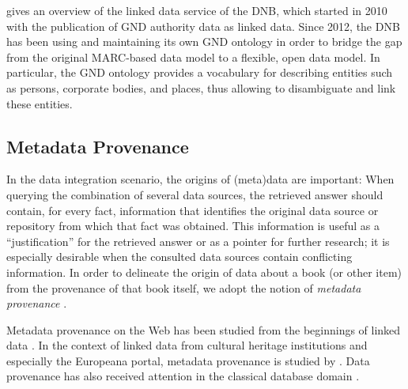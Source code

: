 \textcite{Hauser2014} gives an overview of the linked data service
of the \gls{DNB},
which started in 2010 with the publication of \gls{GND} authority data as linked data.
Since 2012, the \gls{DNB} has been using and maintaining its own \gls{GND} ontology \autocite{GNDOntology}
in order to bridge the gap from the original MARC-based data model to a flexible, open data model.
In particular, the \gls{GND} ontology provides a vocabulary for describing entities such as persons, corporate bodies, and places,
thus allowing to disambiguate and link these entities.

\subsection{Metadata Provenance}
\label{subsec:data_provenance}

In the data integration scenario, the origins of (meta)data are important:
When querying the combination of several data sources, the retrieved answer
should contain, for every fact, information that identifies the original data source or repository
from which that fact was obtained.
This information is useful as a \enquote{justification} for the retrieved answer
or as a pointer for further research;
it is especially desirable when the consulted data sources contain conflicting information.
In order to delineate the origin of data about a book (or other item)
from the provenance of that book itself,
we adopt the notion of \emph{metadata provenance} \autocite{Eckert2012}.

Metadata provenance on the Web
has been studied
from the beginnings of linked data
\autocite[see, e.g.][]{Hartig2009,Moreau2008,Moreau2008a}.
In the context of linked data from cultural heritage institutions
and especially the Europeana portal,
metadata provenance is studied by
\citeauthor{Eckert2013} \autocite*{Eckert2013,Eckert2013a,Eckert2012}.
Data provenance has also received attention 
in the classical database domain
\autocite[see, e.g.,][§14]{Doan2012}.

